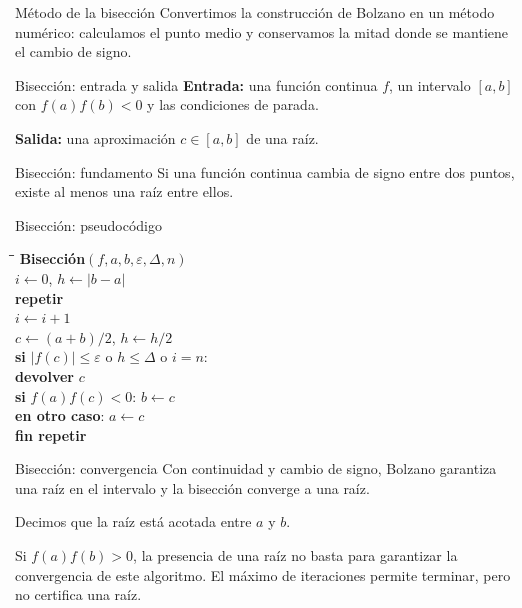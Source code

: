 \documentclass[main.tex]{subfiles}
\begin{document}
\begin{frame}{Método de la bisección}
Convertimos la construcción de Bolzano en un método numérico: calculamos el punto medio y conservamos la mitad donde se mantiene el cambio de signo.
\end{frame}

\begin{frame}{Bisección: entrada y salida}
\textbf{Entrada:} una función continua $f$, un intervalo $[a,b]$ con $f(a)f(b)<0$ y las condiciones de parada.\par\medskip\textbf{Salida:} una aproximación $c\in[a,b]$ de una raíz.
\end{frame}

\begin{frame}{Bisección: fundamento}
Si una función continua cambia de signo entre dos puntos, existe al menos una raíz entre ellos.
\end{frame}

\begin{frame}{Bisección: pseudocódigo}
\footnotesize\begin{tabbing}\hspace{4mm}\=\hspace{5mm}\=\hspace{5mm}\=\kill
\textbf{Bisección}$(f,a,b,\varepsilon,\Delta,n)$\\
$i\gets0$, $h\gets|b-a|$\\
\textbf{repetir}\\
\>$i\gets i+1$\\
\>$c\gets(a+b)/2$, $h\gets h/2$\\
\>\textbf{si} $|f(c)|\le\varepsilon$ o $h\le\Delta$ o $i=n$:\\
\>\>\textbf{devolver} $c$\\
\>\textbf{si} $f(a)f(c)<0$: $b\gets c$\\
\>\textbf{en otro caso}: $a\gets c$\\
\textbf{fin repetir}
\end{tabbing}
\end{frame}

\begin{frame}{Bisección: convergencia}
Con continuidad y cambio de signo, Bolzano garantiza una raíz en el intervalo y la bisección converge a una raíz.\par\medskip Decimos que la raíz está acotada entre $a$ y $b$.\par\medskip Si $f(a)f(b)>0$, la presencia de una raíz no basta para garantizar la convergencia de este algoritmo. El máximo de iteraciones permite terminar, pero no certifica una raíz.
\end{frame}
\end{document}
